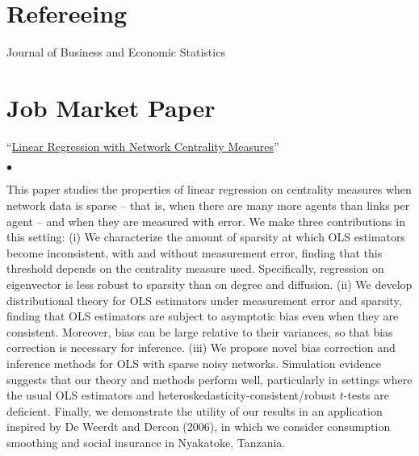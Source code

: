 \documentclass[margin,line]{res}
\newenvironment{list1}{
  \begin{list}{\ding{113}}{%
      \setlength{\itemsep}{.025in}
      \setlength{\parsep}{0in} \setlength{\parskip}{0in}
      \setlength{\topsep}{0in} \setlength{\partopsep}{0in}
      \setlength{\leftmargin}{0.17in}}}{\end{list}}
\newenvironment{list2}{
  \begin{list}{$\bullet$}{%
      \setlength{\itemsep}{0in}
      \setlength{\parsep}{0in} \setlength{\parskip}{0in}
      \setlength{\topsep}{0in} \setlength{\partopsep}{0in}
      \setlength{\leftmargin}{0.2in}}}{\end{list}}
\begin{document}
\begin{resume}

\section{Refereeing}
\begin{list1}
\item[] Journal of Business and Economic Statistics
\end{list1}
\vspace*{.05in}

\newpage

\section{Job Market Paper}
\begin{list1}
\item[] ``\href{https://yong-cai.github.io/assets/images/eigenReg.pdf}{Linear Regression with Network Centrality Measures}''
	\begin{list2}
		\item[] This paper studies the properties of linear regression on centrality measures when network data is sparse -- that is, when there are many more agents than links per agent -- and when they are measured with error. We make three contributions in this setting: (i) We characterize the amount of sparsity at which OLS estimators become inconsistent, with and without measurement error, finding that this threshold depends on the centrality measure used. Specifically, regression on eigenvector is less robust to sparsity than on degree and diffusion. (ii) We develop distributional theory for OLS estimators under measurement error and sparsity, finding that OLS estimators are subject to asymptotic bias even when they are consistent. Moreover, bias can be large relative to their variances, so that bias correction is necessary for inference. (iii) We propose novel bias correction and inference methods for OLS with sparse noisy networks. Simulation evidence suggests that our theory and methods perform well, particularly in settings where the usual OLS estimators and heteroskedasticity-consistent/robust $t$-tests are deficient. Finally, we demonstrate the utility of our results in an application inspired by De Weerdt and Dercon (2006), in which we consider consumption smoothing and social insurance in Nyakatoke, Tanzania.
	\end{list2}
\end{list1}


\end{resume}
\end{document}
